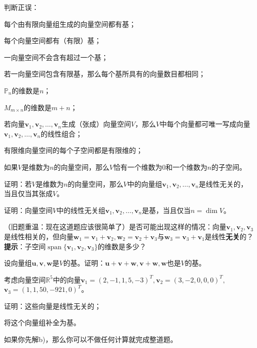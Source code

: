 \begin{problemset}
  \item 判断正误：
  \begin{probenumerate}
    \item 每个由有限向量组生成的向量空间都有基；
    \item 每个向量空间都有（有限）基；
    \item 一向量空间不会含有超过一个基；
    \item 若一向量空间包含有限基，那么每个基所具有的向量数目都相同；
    \item $\mathbb{P}_{n}$的维数是$n$；
    \item $M_{m\times n}$的维数是$m+n$；
    \item 若向量$\mathbf{v}_{1},\mathbf{v}_{2},\ldots,\mathbf{v}_{n}$生成（张成）向量空间$V$，那么$V$中每个向量都可唯一写成向量$\mathbf{v}_{1},\mathbf{v}_{2},\ldots,\mathbf{v}_{n}$的线性组合；
    \item 有限维向量空间的每个子空间都是有限维的；
    \item 如果$V$是维数为$n$的向量空间，那么$V$恰有一个维数为$0$和一个维数为$n$的子空间。
  \end{probenumerate}
  \item 证明：若$V$是维数为$n$的向量空间，那么$V$中的向量组$\mathbf{v}_{1},\mathbf{v}_{2},\ldots,\mathbf{v}_{n}$是线性无关的，当且仅当其张成$V$。
  \item 证明：向量空间$V$中的线性无关组$\mathbf{v}_{1},\mathbf{v}_{2},\ldots,\mathbf{v}_{n}$是基，当且仅当$n=\dim V$。
  \item （旧题重温：现在这道题应该很简单了）是否可能出现这样的情况：向量$\mathbf{v}_{1},\mathbf{v}_{2},\mathbf{v}_{3}$是线性相关的，但向量$\mathbf{w}_1=\mathbf{v}_1+\mathbf{v}_2,\mathbf{w}_2=\mathbf{v}_2+\mathbf{v}_3$与$\mathbf{w}_3=\mathbf{v}_3+\mathbf{v}_1$是线性{\bf 无关}的？{\bf 提示}：子空间$\operatorname{span}\{\mathbf{v}_{1},\mathbf{v}_{2},\mathbf{v}_{3}\}$的维数是多少？
  \item 设向量组$\mathbf{u},\mathbf{v},\mathbf{w}$是$V$的基。证明：$\mathbf{u+v+w},\mathbf{v+w},\mathbf{w}$也是$V$的基。
  \item 考虑向量空间$\mathbb{R}^{5}$中的向量$\mathbf{v}_{1}=(2,-1,1,5,-3)^{T},\mathbf{v}_{2}=(3,-2,0,0,0)^{T},$ $\mathbf{v}_3=(1,1,50,-921,0)^T$。
  \begin{probenumerate}
    \item 证明：这些向量是线性无关的；
    \item 将这个向量组补全为基。
    
    如果你先解b)，那么你可以不做任何计算就完成整道题。
  \end{probenumerate}
\end{problemset}

